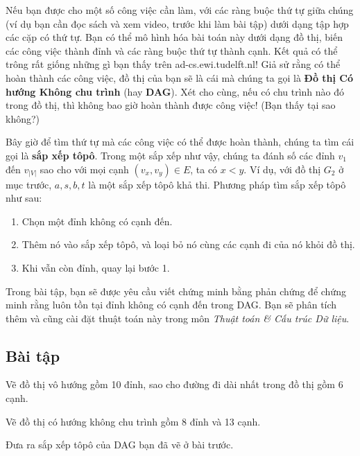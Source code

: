 Nếu bạn được cho một số công việc cần làm, với các ràng buộc thứ tự giữa chúng (ví dụ bạn cần đọc sách và xem video, trước khi làm bài tập) dưới dạng tập hợp các cặp có thứ tự. Bạn có thể mô hình hóa bài toán này dưới dạng đồ thị, biến các công việc thành đỉnh và các ràng buộc thứ tự thành cạnh. Kết quả có thể trông rất giống những gì bạn thấy trên ad-cs.ewi.tudelft.nl! Giả sử rằng có thể hoàn thành các công việc, đồ thị của bạn sẽ là cái mà chúng ta gọi là \textbf{Đồ thị Có hướng Không chu trình} (hay \textbf{DAG}). Xét cho cùng, nếu có chu trình nào đó trong đồ thị, thì không bao giờ hoàn thành được công việc! (Bạn thấy tại sao không?)

Bây giờ để tìm thứ tự mà các công việc có thể được hoàn thành, chúng ta tìm cái gọi là \textbf{sắp xếp tôpô}. Trong một sắp xếp như vậy, chúng ta đánh số các đỉnh $v_1$ đến $v_{|V|}$ sao cho với mọi cạnh $(v_x, v_y) \in E$, ta có $x < y$. Ví dụ, với đồ thị $G_2$ ở mục trước, $a, s, b, t$ là một sắp xếp tôpô khả thi. Phương pháp tìm sắp xếp tôpô như sau:

\begin{enumerate}
\item Chọn một đỉnh không có cạnh đến.
\item Thêm nó vào sắp xếp tôpô, và loại bỏ nó cùng các cạnh đi của nó khỏi đồ thị.
\item Khi vẫn còn đỉnh, quay lại bước 1.
\end{enumerate}

Trong bài tập, bạn sẽ được yêu cầu viết chứng minh bằng phản chứng để chứng minh rằng luôn tồn tại đỉnh không có cạnh đến trong DAG. Bạn sẽ phân tích thêm và cũng cài đặt thuật toán này trong môn \textit{Thuật toán \& Cấu trúc Dữ liệu}.

\subsection*{Bài tập}

\begin{exercise}
Vẽ đồ thị vô hướng gồm 10 đỉnh, sao cho đường đi dài nhất trong đồ thị gồm 6 cạnh.
\end{exercise}

\begin{exercise}
Vẽ đồ thị có hướng không chu trình gồm 8 đỉnh và 13 cạnh.
\end{exercise}

\begin{exercise}
Đưa ra sắp xếp tôpô của DAG bạn đã vẽ ở bài trước.
\end{exercise}

